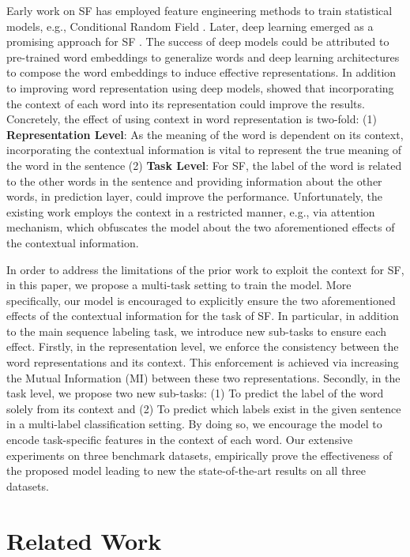 \documentclass[11pt,a4paper]{article}
\begin{document}
Early work on SF has employed feature engineering methods to train statistical models, e.g., Conditional Random Field \cite{raymond:07}. Later, deep learning emerged as a promising approach for SF \cite{yao:14,Peng:15,liu:16}. The success of deep models could be attributed to pre-trained word embeddings to generalize words and deep learning architectures to compose the word embeddings to induce effective representations. In addition to improving word representation using deep models, \cite{liu:16} showed that incorporating the context of each word into its representation could improve the results. Concretely, the effect of using context in word representation is two-fold: (1) \textbf{Representation Level}: As the meaning of the word is dependent on its context, incorporating the contextual information is vital to represent the true meaning of the word in the sentence (2) \textbf{Task Level}: For SF, the label of the word is related to the other words in the sentence and providing information about the other words, in prediction layer, could improve the performance. Unfortunately, the existing work employs the context in a restricted manner, e.g., via attention mechanism, which obfuscates the model about the two aforementioned effects of the contextual information. 

In order to address the limitations of the prior work to exploit the context for SF, in this paper, we propose a multi-task setting to train the model. More specifically, our model is encouraged to explicitly ensure the two aforementioned effects of the contextual information for the task of SF. In particular, in addition to the main sequence labeling task, we introduce new sub-tasks to ensure each effect. Firstly, in the representation level, we enforce the consistency between the word representations and its context. This enforcement is achieved via increasing the Mutual Information (MI) between these two representations. Secondly, in the task level, we propose two new sub-tasks: (1) To predict the label of the word solely from its context and (2) To predict which labels exist in the given sentence in a multi-label classification setting. By doing so, we encourage the model to encode task-specific features in the context of each word. Our extensive experiments on three benchmark datasets, empirically prove the effectiveness of the proposed model leading to new the state-of-the-art results on all three datasets. 





\section{Related Work}
\end{document}
